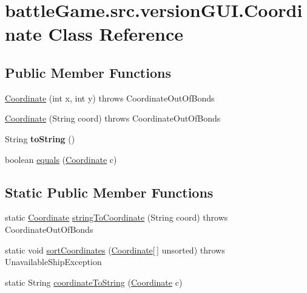 \hypertarget{classbattleGame_1_1src_1_1versionGUI_1_1Coordinate}{}\section{battle\+Game.\+src.\+version\+G\+U\+I.\+Coordinate Class Reference}
\label{classbattleGame_1_1src_1_1versionGUI_1_1Coordinate}
\subsection*{Public Member Functions}
\begin{DoxyCompactItemize}
\item 
\hyperlink{classbattleGame_1_1src_1_1versionGUI_1_1Coordinate_ac341589d4c14c56710e0b8f4ac5f93b8}{Coordinate} (int x, int y)  throws Coordinate\+Out\+Of\+Bonds 
\item 
\hyperlink{classbattleGame_1_1src_1_1versionGUI_1_1Coordinate_a630457399ada4b845600fd311ad6dc91}{Coordinate} (String coord)  throws Coordinate\+Out\+Of\+Bonds
\item 
String {\bfseries to\+String} ()\hypertarget{classbattleGame_1_1src_1_1versionGUI_1_1Coordinate_a66d2d38f92a5789113cb11b5f13fda75}{}\label{classbattleGame_1_1src_1_1versionGUI_1_1Coordinate_a66d2d38f92a5789113cb11b5f13fda75}

\item 
boolean \hyperlink{classbattleGame_1_1src_1_1versionGUI_1_1Coordinate_a2bee552efa3a2e5b0779d85e2c32150c}{equals} (\hyperlink{classbattleGame_1_1src_1_1versionGUI_1_1Coordinate}{Coordinate} c)
\end{DoxyCompactItemize}
\subsection*{Static Public Member Functions}
\begin{DoxyCompactItemize}
\item 
static \hyperlink{classbattleGame_1_1src_1_1versionGUI_1_1Coordinate}{Coordinate} \hyperlink{classbattleGame_1_1src_1_1versionGUI_1_1Coordinate_a8ea27d1f51968184e2a686491f964c65}{string\+To\+Coordinate} (String coord)  throws Coordinate\+Out\+Of\+Bonds
\item 
static void \hyperlink{classbattleGame_1_1src_1_1versionGUI_1_1Coordinate_ab033129a7b72a10f1e9234d10b2b25df}{sort\+Coordinates} (\hyperlink{classbattleGame_1_1src_1_1versionGUI_1_1Coordinate}{Coordinate}\mbox{[}$\,$\mbox{]} unsorted)  throws Unavailable\+Ship\+Exception
\item 
static String \hyperlink{classbattleGame_1_1src_1_1versionGUI_1_1Coordinate_a8c38ce3f29b9a9a9dbe14c4ddaecfc17}{coordinate\+To\+String} (\hyperlink{classbattleGame_1_1src_1_1versionGUI_1_1Coordinate}{Coordinate} c)
\end{DoxyCompactItemize}


